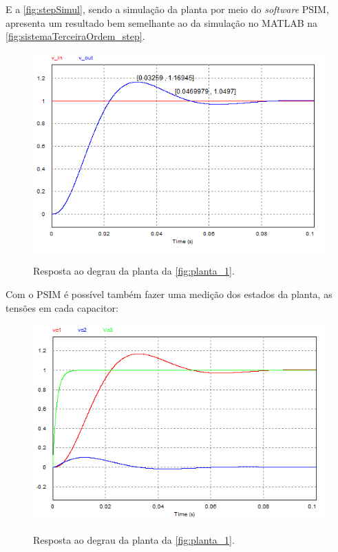 \documentclass[
	article,			%
	11pt,				%
	oneside,			%
	a4paper,			%
	english,			%
	brazil,				%
	sumario=tradicional
	]{abntex2}
\begin{document}
\pagebreak

E a \autoref{fig:stepSimul}, sendo a simulação da planta por meio do \textit{software} PSIM, apresenta um resultado bem semelhante ao da simulação no MATLAB na \autoref{fig:sistemaTerceiraOrdem_step}.

\begin{figure}[htb!]
	\centering
	\caption{Resposta ao degrau da planta da \autoref{fig:planta_1}.}
	\includegraphics[scale=0.75]{./img/stepSimul.PNG}
	\label{fig:stepSimul}
\end{figure}

Com o PSIM é possível também fazer uma medição dos estados da planta, as tensões em cada capacitor:

\begin{figure}[htb!]
	\centering
	\caption{Resposta ao degrau da planta da \autoref{fig:planta_1}.}
	\includegraphics[scale=0.75]{./img/stepSimul_estados.PNG}
	\label{fig:stepSimul_estados}
\end{figure}
\end{document}
